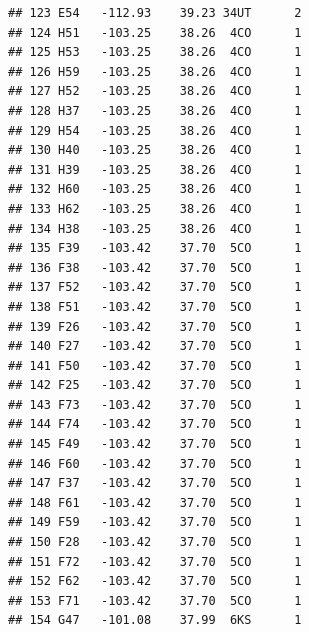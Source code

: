 \documentclass[]{article}
\newenvironment{Shaded}{\begin{snugshade}}{\end{snugshade}}
\newcommand{\KeywordTok}[1]{\textcolor[rgb]{0.13,0.29,0.53}{\textbf{#1}}}
\newcommand{\DataTypeTok}[1]{\textcolor[rgb]{0.13,0.29,0.53}{#1}}
\newcommand{\DecValTok}[1]{\textcolor[rgb]{0.00,0.00,0.81}{#1}}
\newcommand{\StringTok}[1]{\textcolor[rgb]{0.31,0.60,0.02}{#1}}
\newcommand{\OperatorTok}[1]{\textcolor[rgb]{0.81,0.36,0.00}{\textbf{#1}}}
\newcommand{\NormalTok}[1]{#1}
\begin{document}
\begin{verbatim}
## 123 E54   -112.93    39.23 34UT      2
## 124 H51   -103.25    38.26  4CO      1
## 125 H53   -103.25    38.26  4CO      1
## 126 H59   -103.25    38.26  4CO      1
## 127 H52   -103.25    38.26  4CO      1
## 128 H37   -103.25    38.26  4CO      1
## 129 H54   -103.25    38.26  4CO      1
## 130 H40   -103.25    38.26  4CO      1
## 131 H39   -103.25    38.26  4CO      1
## 132 H60   -103.25    38.26  4CO      1
## 133 H62   -103.25    38.26  4CO      1
## 134 H38   -103.25    38.26  4CO      1
## 135 F39   -103.42    37.70  5CO      1
## 136 F38   -103.42    37.70  5CO      1
## 137 F52   -103.42    37.70  5CO      1
## 138 F51   -103.42    37.70  5CO      1
## 139 F26   -103.42    37.70  5CO      1
## 140 F27   -103.42    37.70  5CO      1
## 141 F50   -103.42    37.70  5CO      1
## 142 F25   -103.42    37.70  5CO      1
## 143 F73   -103.42    37.70  5CO      1
## 144 F74   -103.42    37.70  5CO      1
## 145 F49   -103.42    37.70  5CO      1
## 146 F60   -103.42    37.70  5CO      1
## 147 F37   -103.42    37.70  5CO      1
## 148 F61   -103.42    37.70  5CO      1
## 149 F59   -103.42    37.70  5CO      1
## 150 F28   -103.42    37.70  5CO      1
## 151 F72   -103.42    37.70  5CO      1
## 152 F62   -103.42    37.70  5CO      1
## 153 F71   -103.42    37.70  5CO      1
## 154 G47   -101.08    37.99  6KS      1
\end{verbatim}

\begin{Shaded}
\end{Shaded}
\end{document}
